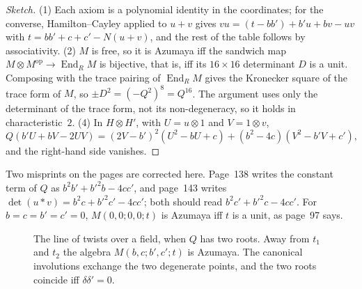 \documentclass[11pt,a4paper]{amsart}
\theoremstyle{definition}
\theoremstyle{remark}
\begin{document}
\begin{proof}[Sketch]
(1) Each axiom is a polynomial identity in the coordinates; for the converse, Hamilton--Cayley applied to $u + v$ gives $vu = (t - bb') + b'u + bv - uv$ with $t = bb' + c + c' - N(u + v)$, and the rest of the table follows by associativity. (2) $M$ is free, so it is Azumaya iff the sandwich map $M \otimes M^{\mathrm{op}} \to \operatorname{End}_R M$ is bijective, that is, iff its $16 \times 16$ determinant $D$ is a unit. Composing with the trace pairing of $\operatorname{End}_R M$ gives the Kronecker square of the trace form of $M$, so $\pm D^2 = (-Q^2)^8 = Q^{16}$. The argument uses only the determinant of the trace form, not its non-degeneracy, so it holds in characteristic~$2$. (4) In $H \otimes H'$, with $U = u \otimes 1$ and $V = 1 \otimes v$,
\[
Q(b'U + bV - 2UV) = (2V - b')^2(U^2 - bU + c) + (b^2 - 4c)(V^2 - b'V + c'),
\]
and the right-hand side vanishes.
\end{proof}

Two misprints on the pages are corrected here. Page~138 writes the constant term of $Q$ as $b^2b' + b'^2b - 4cc'$, and page~143 writes $\det(u * v) = b^2c + b'^2c' - 4cc'$; both should read $b^2c' + b'^2c - 4cc'$. For $b = c = b' = c' = 0$, $M(0,0;0,0;t)$ is Azumaya iff $t$ is a unit, as page~97 says.

\begin{figure}[ht]
\centering
{}
\caption{The line of twists over a field, when $Q$ has two roots. Away from $t_1$ and $t_2$ the algebra $M(b, c; b', c'; t)$ is Azumaya. The canonical involutions exchange the two degenerate points, and the two roots coincide iff $\delta\delta' = 0$.}
\label{fig:twist}
\end{figure}
\end{document}
